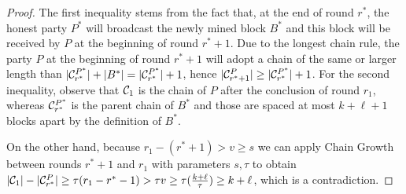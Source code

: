 \begin{proof}
  The first inequality stems from the fact that, at the end of round
  $r^*$, the honest party $P^*$ will broadcast the newly mined block $B^*$
  and this block will be received by $P$ at the beginning of round $r^* + 1$.
  Due to the longest chain rule, the party $P$ at the beginning of round $r^* + 1$ will
  adopt a chain of the same or larger length than
  $|\mathcal{C}^{P^*}_{r^*}| + |B^*| = |\mathcal{C}^{P^*}_{r^*}| + 1$,
  hence
  $|\mathcal{C}^P_{r^* + 1}| \geq |\mathcal{C}^{P^*}_{r^*}| + 1$.
  For the second inequality, observe that
  $\mathcal{C}_1$ is the chain of $P$ after the conclusion
  of round $r_1$, whereas $\mathcal{C}^{P^*}_{r^*}$ is
  the parent chain of $B^*$ and those are spaced at most $k + \ell + 1$ blocks apart by the definition
  of $B^*$.

  On the other hand, because $r_1 - (r^* + 1) > v \geq s$ we can apply Chain Growth
  between rounds $r^* + 1$ and $r_1$
  with parameters
  $s, \tau$ to obtain
  $|\mathcal{C}_1| - |\mathcal{C}^P_{r^*}| \geq \tau(r_1 - r^* - 1) > \tau v \geq
  \tau (\frac{k + \ell}{\tau}) \geq k + \ell$,
  which is a contradiction.

  \Qed
\end{proof}

